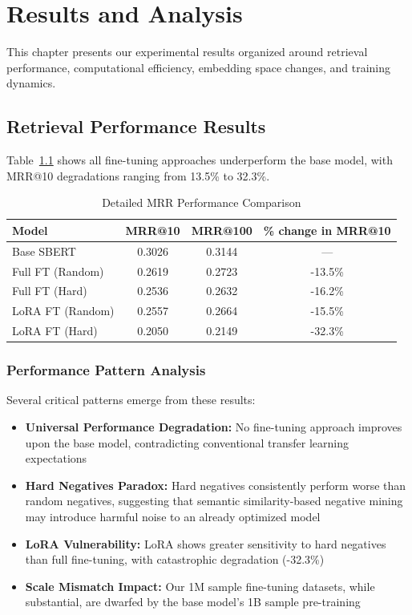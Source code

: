 \chapter{Results and Analysis} %

\label{Chapter5} %


This chapter presents our experimental results organized around retrieval performance, computational efficiency, embedding space changes, and training dynamics.

\section{Retrieval Performance Results}

Table~\ref{tab:mrr_detailed_thesis} shows all fine-tuning approaches underperform the base model, with MRR@10 degradations ranging from 13.5\% to 32.3\%.

\begin{table}[h]
\centering
\caption{Detailed MRR Performance Comparison}
\label{tab:mrr_detailed_thesis}
\begin{tabular}{lccc}
\toprule
Model & MRR@10 & MRR@100 & \% change in MRR@10 \\
\midrule
Base SBERT & 0.3026 & 0.3144 & — \\
Full FT (Random) & 0.2619 & 0.2723 & -13.5\% \\
Full FT (Hard) & 0.2536 & 0.2632 & -16.2\% \\
LoRA FT (Random) & 0.2557 & 0.2664 & -15.5\% \\
LoRA FT (Hard) & 0.2050 & 0.2149 & -32.3\% \\
\bottomrule
\end{tabular}
\end{table}

\subsection{Performance Pattern Analysis}

Several critical patterns emerge from these results:

\begin{itemize}
\item \textbf{Universal Performance Degradation:} No fine-tuning approach improves upon the base model, contradicting conventional transfer learning expectations
\item \textbf{Hard Negatives Paradox:} Hard negatives consistently perform worse than random negatives, suggesting that semantic similarity-based negative mining may introduce harmful noise to an already optimized model
\item \textbf{LoRA Vulnerability:} LoRA shows greater sensitivity to hard negatives than full fine-tuning, with catastrophic degradation (-32.3\%)
\item \textbf{Scale Mismatch Impact:} Our 1M sample fine-tuning datasets, while substantial, are dwarfed by the base model's 1B sample pre-training
\end{itemize}
